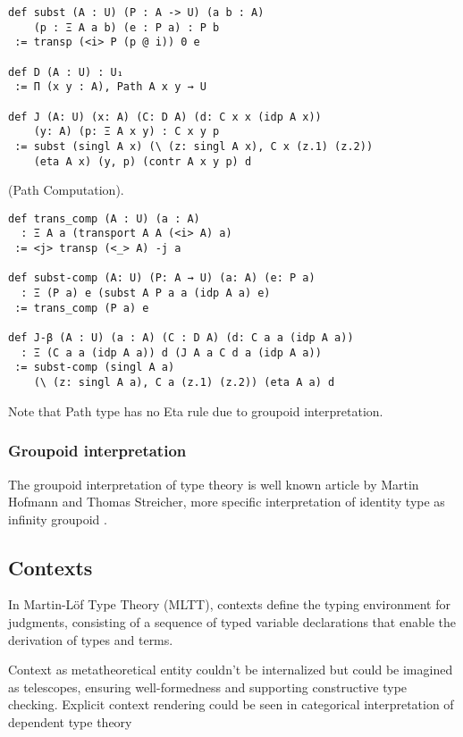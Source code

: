 \documentclass{article}
\begin{document}
\begin{theorem}
\begin{lstlisting}
def subst (A : U) (P : A -> U) (a b : A)
    (p : Ξ A a b) (e : P a) : P b
 := transp (<i> P (p @ i)) 0 e

def D (A : U) : U₁
 := Π (x y : A), Path A x y → U

def J (A: U) (x: A) (C: D A) (d: C x x (idp A x))
    (y: A) (p: Ξ A x y) : C x y p
 := subst (singl A x) (\ (z: singl A x), C x (z.1) (z.2))
    (eta A x) (y, p) (contr A x y p) d
\end{lstlisting}
\end{theorem}

\begin{theorem} (Path Computation).
\begin{lstlisting}
def trans_comp (A : U) (a : A)
  : Ξ A a (transport A A (<i> A) a)
 := <j> transp (<_> A) -j a

def subst-comp (A: U) (P: A → U) (a: A) (e: P a)
  : Ξ (P a) e (subst A P a a (idp A a) e)
 := trans_comp (P a) e

def J-β (A : U) (a : A) (C : D A) (d: C a a (idp A a))
  : Ξ (C a a (idp A a)) d (J A a C d a (idp A a))
 := subst-comp (singl A a)
    (\ (z: singl A a), C a (z.1) (z.2)) (eta A a) d
\end{lstlisting}
\end{theorem}

Note that Path type has no Eta rule due to groupoid interpretation.

\subsubsection*{Groupoid interpretation}
The groupoid interpretation of type theory is well known article by Martin Hofmann and Thomas Streicher,
more specific interpretation of identity type as infinity groupoid \cite{Hofmann96}.


\subsection*{Contexts}
In Martin-Löf Type Theory (MLTT), contexts define the typing
environment for judgments, consisting of a sequence of typed
variable declarations that enable the derivation of types and
terms.

Context as metatheoretical entity couldn't be internalized but could be
imagined as telescopes, ensuring well-formedness and supporting
constructive type checking. Explicit context rendering could be
seen in categorical interpretation of dependent type theory
\end{document}
